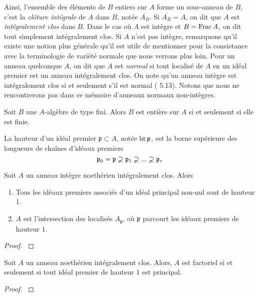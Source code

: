 Ainsi, l'ensemble des éléments de $B$ entiers sur $A$ forme un sous-anneau de $B$, c'est la \textit{clôture intégrale} de $A$ dans $B$, notée $\overline{A_B}$. Si $\overline{A_B}=A$, on dit que $A$ est \textit{intégralement clos} dans $B$. Dans le cas où $A$ est intègre et $B=\operatorname{Frac} A$, on dit tout simplement intégralement clos. Si $A$ n'est pas intègre, remarquons qu'il existe une notion plus générale qu'il est utile de mentionner pour la consistance avec la terminologie de variété normale que nous verrons plus loin. Pour un anneau quelconque $A$, on dit que $A$ est \textit{normal} si tout localisé de $A$ en un idéal premier est un anneau intégralement clos. On note qu'un anneau intègre est intégralement clos si et seulement s'il est normal (\cite{atiyahmacdo} 5.13). Notons que nous ne rencontrerons pas dans ce mémoire d'anneaux normaux non-intègres.

\begin{cor}
Soit $B$ une $A$-algèbre de type fini. Alors $B$ est entière sur $A$ si et seulement si elle est finie.
\end{cor}

\begin{defn}
La hauteur d'un idéal premier $\mathfrak{p}\subset A$, notée $\operatorname{ht} \mathfrak{p}$, est la borne supérieure des longueurs de chaînes d'idéaux premiers
$$\mathfrak{p}_0=\mathfrak{p}\varsupsetneq \mathfrak{p}_1 \varsupsetneq...\varsupsetneq  \mathfrak{p}_r$$
\end{defn}


\begin{thm}\label{factonormal}
Soit $A$ un anneau intègre noethérien intégralement clos. Alors
\begin{enumerate}
\item Tous les idéaux premiers associés d'un idéal principal non-nul sont de hauteur 1.
\item $A$ est l'intersection des localisés $A_\mathfrak{p}$, où $\mathfrak{p}$ parcourt les idéaux premiers de hauteur $1$.
\end{enumerate}
\end{thm}
\begin{proof}
\cite[11.5]{Matsumura} 
\end{proof}


\begin{thm}\label{UFDPID}
Soit $A$ un anneau noethérien intégralement clos. Alors,
$A$ est factoriel si et seulement si tout idéal premier de hauteur $1$ est principal.
\end{thm}
\begin{proof}
\cite[20.1]{Matsumura} 
\end{proof}

